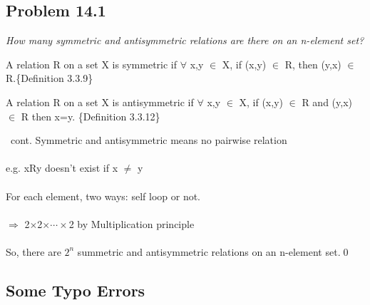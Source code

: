 \documentclass{beamer}
\begin{document}
        
        
    \subsection{Problem 14.1}
    
        \begin{frame}[c,shrink]{\subsecname}
            \textit{How many symmetric and antisymmetric relations are there on an n-element
set?}\\\pause
                \begin{definition}
			    A relation R on a set X is \alert{symmetric} if $\forall$ x,y $\in$ X, if (x,y) $\in$ R, then (y,x) $\in$ R.\{Definition 3.3.9\}
                \end{definition}\pause
                \begin{definition}
			    A relation R on a set X is \alert{antisymmetric} if $\forall$ x,y $\in$ X, if (x,y) $\in$ R and (y,x) $\in$ R then x=y. \{Definition 3.3.12\}
                \end{definition}
        \end{frame}
    
        \begin{frame}[c]{\subsecname\ cont.}
            Symmetric and antisymmetric means \alert{no pairwise relation}\\$\;$\\\pause
            e.g. xRy doesn't exist if x $\neq$ y\\$\;$\\\pause
            For each element, two ways: self loop or not.\\$\;$\\\pause
            $\Rightarrow$ 2$\times$2$\times\cdots\times$2 by Multiplication principle\\$\;$\\\pause
            So, there are $2^n$ summetric and antisymmetric relations on an n-element set.\qed
        \end{frame}
        
        
        
\subsection{Some Typo Errors}
\end{document}
